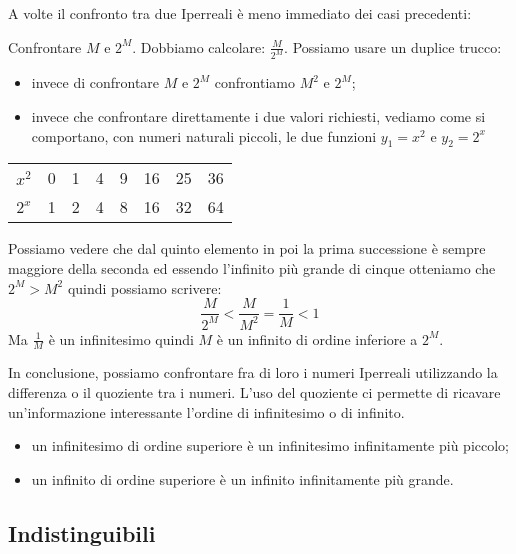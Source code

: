 \vspace{1em}
A volte il confronto tra due Iperreali è meno immediato dei casi precedenti:
\begin{esempio}
 Confrontare \(M\) e \(2^M\). 
 Dobbiamo calcolare: \(\frac{M}{2^M}\). 
Possiamo usare un duplice trucco: 
\begin{itemize} [nosep]
 \item invece di confrontare \(M\) e \(2^M\) confrontiamo \(M^2\) e \(2^M\);
 \item invece che confrontare direttamente i due valori richiesti, vediamo 
come si comportano, con numeri naturali piccoli, le due funzioni 
\(y_1=x^2\) e \(y_2=2^x\)
\end{itemize}
\begin{center}
\begin{tabular}{cccccccc}
\(x^2\) & 0 & 1 & 4 & 9 & 16 & 25 & 36\\
\(2^x\) & 1 & 2 & 4 & 8 & 16 & 32 & 64
\end{tabular}
\end{center}
Possiamo vedere che dal quinto elemento in poi la prima successione è sempre
maggiore della seconda ed essendo l'infinito più grande di cinque 
otteniamo che \(2^M > M^2\) quindi possiamo scrivere:
\[\frac{M}{2^M} < \frac{M}{M^2} = \frac{1}{M} < 1\]
Ma \(\frac{1}{M}\) è un infinitesimo quindi \(M\) è un infinito di ordine 
inferiore a \(2^M\).
\end{esempio}

In conclusione, possiamo confrontare fra di loro i numeri Iperreali 
utilizzando la differenza o il quoziente tra i numeri. L'uso del quoziente 
ci permette di ricavare un'informazione interessante l'ordine di 
infinitesimo o di infinito.
\begin{itemize} [noitemsep]
 \item un infinitesimo di ordine superiore è un infinitesimo infinitamente 
 più piccolo;
 \item un infinito di ordine superiore è un infinito infinitamente più 
grande.
\end{itemize}

\subsection{Indistinguibili}
\label{subsec:insnum_indistinguibili}

